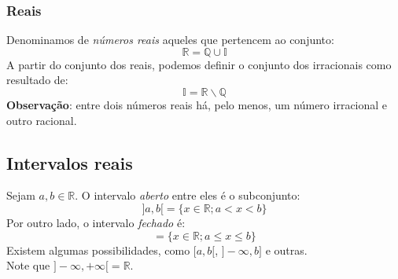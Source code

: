 \documentclass[13pt,letterpaper]{article}
\begin{document}
\subsubsection{Reais}
Denominamos de \emph{números reais} aqueles que pertencem ao conjunto:
\begin{displaymath}
    \mathbb{R} = \mathbb{Q} \cup \mathbb{I}
\end{displaymath}
A partir do conjunto dos reais, podemos definir o conjunto dos irracionais como resultado de:
\begin{displaymath}
    \mathbb{I} = \mathbb{R} \backslash \mathbb{Q}
\end{displaymath}
\textbf{Observação}: entre dois números reais há, pelo menos, um número irracional e outro racional.

\subsection{Intervalos reais}
Sejam $a, b \in \mathbb{R}$. O intervalo \emph{aberto} entre eles é o subconjunto:
\begin{displaymath}
    ]a, b[ = \{ x \in \mathbb{R}; a < x < b\}
\end{displaymath}
Por outro lado, o intervalo \emph{fechado} é:
\begin{displaymath}
    [a, b] = \{ x \in \mathbb{R}; a \leq x \leq b\}
\end{displaymath}
Existem algumas possibilidades, como $[a, b[$, $] - \infty, b] $ e outras. \\ Note que $ ]-\infty, +\infty [ = \mathbb{R}$.

\end{document}
